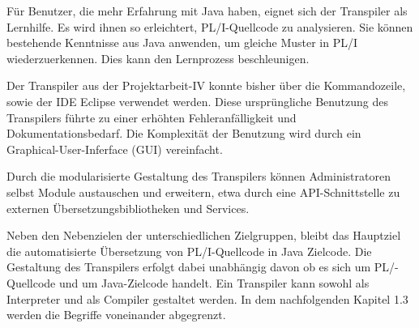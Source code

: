 Für Benutzer, die mehr Erfahrung mit Java haben, eignet sich der Transpiler als Lernhilfe. Es wird ihnen so erleichtert, PL/I-Quellcode zu analysieren. Sie können bestehende Kenntnisse aus Java anwenden, um gleiche Muster in PL/I wiederzuerkennen. Dies kann den Lernprozess beschleunigen.

Der Transpiler aus der Projektarbeit-IV konnte bisher über die Kommandozeile, sowie der IDE Eclipse verwendet werden. Diese ursprüngliche Benutzung des Transpilers führte zu einer erhöhten Fehleranfälligkeit und Dokumentationsbedarf. Die Komplexität der Benutzung wird durch ein Graphical-User-Inferface (GUI) vereinfacht.

Durch die modularisierte Gestaltung des Transpilers können Administratoren selbst Module austauschen und erweitern, etwa durch eine API-Schnittstelle zu externen Übersetzungsbibliotheken und Services. 

Neben den Nebenzielen der unterschiedlichen Zielgruppen, bleibt das Hauptziel die automatisierte Übersetzung von PL/I-Quellcode in Java Zielcode. Die Gestaltung des Transpilers erfolgt dabei unabhängig davon ob es sich um PL/-Quellcode und um Java-Zielcode handelt. 
Ein Transpiler kann sowohl als Interpreter und als Compiler gestaltet werden. In dem nachfolgenden Kapitel 1.3 werden die Begriffe voneinander abgegrenzt. 
	
%
	
 
    \pagebreak

